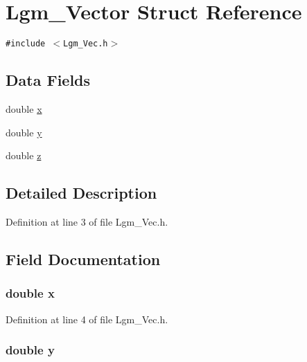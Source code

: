 \hypertarget{struct_lgm___vector}{
\section{Lgm\_\-Vector Struct Reference}
\label{struct_lgm___vector}
}
{\tt \#include $<$Lgm\_\-Vec.h$>$}

\subsection*{Data Fields}
\begin{CompactItemize}
\item 
double \hyperlink{struct_lgm___vector_f88b946fb90d5f08b5fb740c70e98c10}{x}
\item 
double \hyperlink{struct_lgm___vector_b927965981178aa1fba979a37168db2a}{y}
\item 
double \hyperlink{struct_lgm___vector_b3e6ed577a7c669c19de1f9c1b46c872}{z}
\end{CompactItemize}


\subsection{Detailed Description}


Definition at line 3 of file Lgm\_\-Vec.h.

\subsection{Field Documentation}
\hypertarget{struct_lgm___vector_f88b946fb90d5f08b5fb740c70e98c10}{
\subsubsection[{x}]{\setlength{\rightskip}{0pt plus 5cm}double {\bf x}}}
\label{struct_lgm___vector_f88b946fb90d5f08b5fb740c70e98c10}




Definition at line 4 of file Lgm\_\-Vec.h.\hypertarget{struct_lgm___vector_b927965981178aa1fba979a37168db2a}{
\subsubsection[{y}]{\setlength{\rightskip}{0pt plus 5cm}double {\bf y}}}
\label{struct_lgm___vector_b927965981178aa1fba979a37168db2a}




